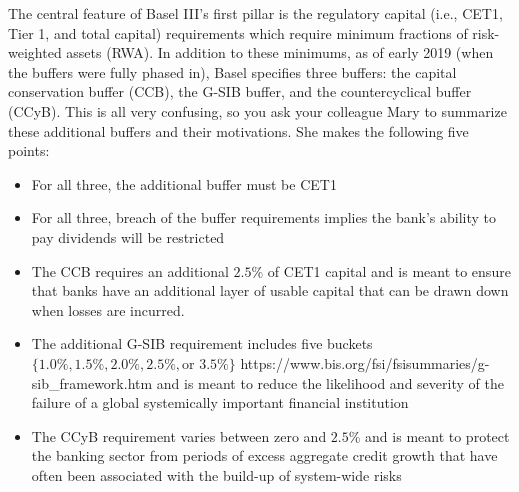 \documentclass{article}
\newcounter{question} %
\begin{document}
  
  \begin{question}
      The central feature of Basel III's first pillar is the regulatory capital (i.e., CET1, Tier 1, and total capital) requirements which require minimum fractions of risk-weighted assets (RWA). In addition to these minimums, as of early 2019 (when the buffers were fully phased in), Basel specifies three buffers: the capital conservation buffer (CCB), the G-SIB buffer, and the countercyclical buffer (CCyB). This is all very confusing, so you ask your colleague Mary to summarize these additional buffers and their motivations. She makes the following five points:
  
      \begin{itemize}
          \item[I.] For all three, the additional buffer must be CET1
          \item[II.] For all three, breach of the buffer requirements implies the bank’s ability to pay dividends will be restricted
          \item[III.] The CCB requires an additional $2.5\%$ of CET1 capital and is meant to ensure that banks have an additional layer of usable capital that can be drawn down when losses are incurred.
          \item[IV.] The additional G-SIB requirement includes five buckets $\{1.0\%, 1.5\%, 2.0\%, 2.5\%, \text{or } 3.5\%\}$ https://www.bis.org/fsi/fsisummaries/g-sib\_framework.htm and is meant to reduce the likelihood and severity of the failure of a global systemically important financial institution
          \item[V.] The CCyB requirement varies between zero and $2.5\%$ and is meant to protect the banking sector from periods of excess aggregate credit growth that have often been associated with the build-up of system-wide risks
      \end{itemize}
  

\end{question}
\end{document}
